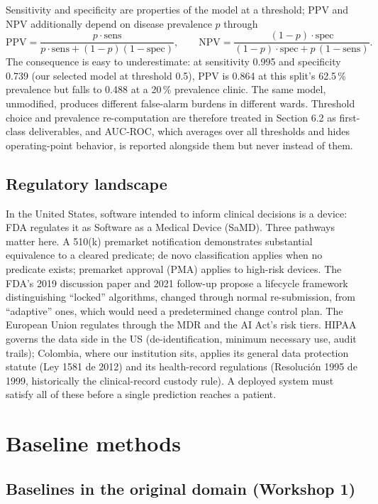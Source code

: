 \documentclass[11pt,a4paper]{article}
\begin{document}
Sensitivity and specificity are properties of the model at a threshold; PPV and NPV additionally depend on disease prevalence $p$ through
\[
\mathrm{PPV} = \frac{p \cdot \text{sens}}{p \cdot \text{sens} + (1-p)(1-\text{spec})},
\qquad
\mathrm{NPV} = \frac{(1-p)\cdot \text{spec}}{(1-p)\cdot \text{spec} + p\,(1-\text{sens})}.
\]
The consequence is easy to underestimate: at sensitivity 0.995 and specificity 0.739 (our selected model at threshold 0.5), PPV is 0.864 at this split's 62.5\,\% prevalence but falls to 0.488 at a 20\,\% prevalence clinic. The same model, unmodified, produces different false-alarm burdens in different wards. Threshold choice and prevalence re-computation are therefore treated in Section 6.2 as first-class deliverables, and AUC-ROC, which averages over all thresholds and hides operating-point behavior, is reported alongside them but never instead of them.

\subsection{Regulatory landscape}

In the United States, software intended to inform clinical decisions is a device: FDA regulates it as Software as a Medical Device (SaMD). Three pathways matter here. A 510(k) premarket notification demonstrates substantial equivalence to a cleared predicate; de novo classification applies when no predicate exists; premarket approval (PMA) applies to high-risk devices. The FDA's 2019 discussion paper and 2021 follow-up propose a lifecycle framework distinguishing ``locked'' algorithms, changed through normal re-submission, from ``adaptive'' ones, which would need a predetermined change control plan. The European Union regulates through the MDR and the AI Act's risk tiers. HIPAA governs the data side in the US (de-identification, minimum necessary use, audit trails); Colombia, where our institution sits, applies its general data protection statute (Ley 1581 de 2012) and its health-record regulations (Resoluci\'on 1995 de 1999, historically the clinical-record custody rule). A deployed system must satisfy all of these before a single prediction reaches a patient.

\section{Baseline methods}

\subsection{Baselines in the original domain (Workshop 1)}
\end{document}
